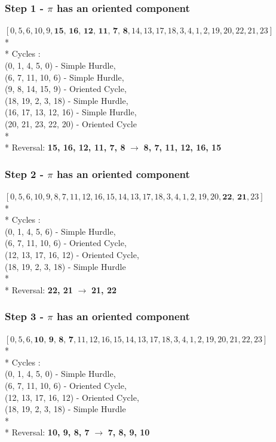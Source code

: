 \documentclass[10pt]{article}
\begin{document}
\subsubsection*{Step 1 - $\pi$ has an oriented component}
$[0, 5, 6, 10, 9, \textbf{15, 16, 12, 11, 7, 8}, 14, 13, 17, 18, 3, 4, 1, 2, 19, 20, 22, 21, 23]$
\\*
\\*
Cycles :\\(0, 1, 4, 5, 0) - Simple Hurdle, 
        \\(6, 7, 11, 10, 6) - Simple Hurdle, 
        \\(9, 8, 14, 15, 9) - Oriented Cycle, 
        \\(18, 19, 2, 3, 18) - Simple Hurdle, 
        \\(16, 17, 13, 12, 16) - Simple Hurdle,
        \\ (20, 21, 23, 22, 20) - Oriented Cycle
\\*
\\*
Reversal: \textbf{15, 16, 12, 11, 7, 8} $\rightarrow$ \textbf{8, 7, 11, 12, 16, 15}
\subsubsection*{Step 2 - $\pi$ has an oriented component}
$[0, 5, 6, 10, 9, 8, 7, 11, 12, 16, 15, 14, 13, 17, 18, 3, 4, 1, 2, 19, 20, \textbf{22, 21}, 23]$
\\*
\\*
Cycles :\\(0, 1, 4, 5, 6) - Simple Hurdle,
        \\(6, 7, 11, 10, 6) - Oriented Cycle,
        \\(12, 13, 17, 16, 12) - Oriented Cycle,
        \\(18, 19, 2, 3, 18) - Simple Hurdle
\\*
\\*
Reversal: \textbf{22, 21} $\rightarrow$ \textbf{21, 22}

\subsubsection*{Step 3 - $\pi$ has an oriented component}
$[0, 5, 6, \textbf{10, 9, 8, 7}, 11, 12, 16, 15, 14, 13, 17, 18, 3, 4, 1, 2, 19, 20, 21, 22, 23]$
\\*
\\*
Cycles :\\(0, 1, 4, 5, 0) - Simple Hurdle,
        \\(6, 7, 11, 10, 6) - Oriented Cycle,
        \\(12, 13, 17, 16, 12) - Oriented Cycle,
        \\(18, 19, 2, 3, 18) - Simple Hurdle
\\*
\\*
Reversal: \textbf{10, 9, 8, 7} $\rightarrow$ \textbf{7, 8, 9, 10}
\end{document}
